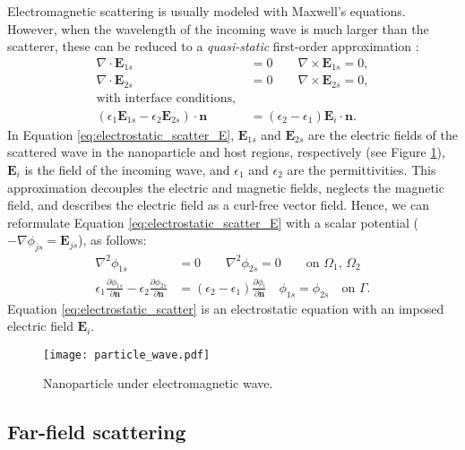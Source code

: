 Electromagnetic scattering is usually modeled with Maxwell's equations.
However, when the wavelength of the incoming wave is much larger than the
scatterer, these can be reduced to a \emph{quasi-static} 
first-order approximation \cite{MayergoyzZhang2007}:
%
\begin{align} \label{eq:electrostatic_scatter_E}
\nabla \cdot \mathbf{E}_{1s} &= 0 \qquad \nabla \times \mathbf{E}_{1s} = 0, \nonumber \\
\nabla \cdot \mathbf{E}_{2s} &= 0 \qquad \nabla \times \mathbf{E}_{2s} = 0, \nonumber \\
\text{with interface conditions, } \nonumber \\
(\epsilon_1\mathbf{E}_{1s} - \epsilon_2\mathbf{E}_{2s})\cdot\mathbf{n} &= (\epsilon_2-\epsilon_1)\mathbf{E}_i\cdot \mathbf{n}.
\end{align}
%
In Equation \eqref{eq:electrostatic_scatter_E}, $\mathbf{E}_{1s}$ and $\mathbf{E}_{2s}$ 
are the electric fields of the scattered wave in the nanoparticle and host regions, respectively 
(see Figure \ref{fig:part_wave}), 
$\mathbf{E}_{i}$ is the field of the incoming wave, and $\epsilon_1$ 
and $\epsilon_2$ are the permittivities.
This approximation decouples the electric and magnetic fields, neglects the magnetic field, 
and describes the electric field as a curl-free vector field.
Hence, we can reformulate Equation \eqref{eq:electrostatic_scatter_E} with a scalar potential
($-\nabla \phi_{js} = \mathbf{E}_{js}$), as follows:
%
\begin{align} \label{eq:electrostatic_scatter}
\nabla^2 \phi_{1s} &= 0 \qquad \nabla^2 \phi_{2s} = 0 \qquad\text{on $\Omega_1$, $\Omega_2$} \nonumber \\
\epsilon_1\frac{\partial\phi_{1s}}{\partial \mathbf{n}} - \epsilon_2\frac{\partial\phi_{2s}}{\partial\mathbf{n}} &= (\epsilon_2-\epsilon_1)\frac{\partial\phi_i}{\partial\mathbf{n}} \quad \phi_{1s} = \phi_{2s} \quad \text{on $\Gamma$}.
\end{align}
%
Equation \eqref{eq:electrostatic_scatter} is an electrostatic equation 
with an imposed electric field $\mathbf{E}_i$.

\begin{figure}[h] %
   \centering
   \texttt{[image: particle\_wave.pdf]} 
   \caption{Nanoparticle under electromagnetic wave.}
   \label{fig:part_wave}
\end{figure}

\subsection{Far-field scattering} \label{sec:ff_scattering}

